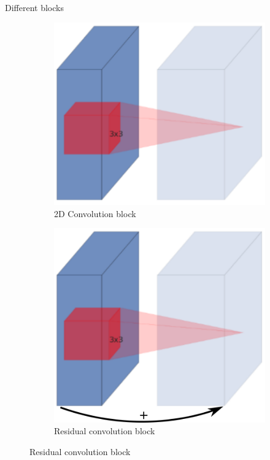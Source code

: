 \documentclass{beamer}
\begin{document}
\begin{frame}{Different blocks}
    \begin{figure}
  \begin{center}
    \begin{subfigure}[t]{.24\linewidth}
      \centering
      \includegraphics[width=.8\linewidth]{figures/mobilenetv2_conv.png}
      \caption{2D Convolution block}
      \label{fig:convblock}
    \end{subfigure}
    \begin{subfigure}[t]{.24\linewidth}
      \centering
      \includegraphics[width=.8\linewidth]{figures/mobilenetv2_resnet.png}
      \caption{Residual convolution block}
      \label{fig:resblock}
    \end{subfigure}

\end{center}
\end{figure}
\end{frame}
\end{document}
